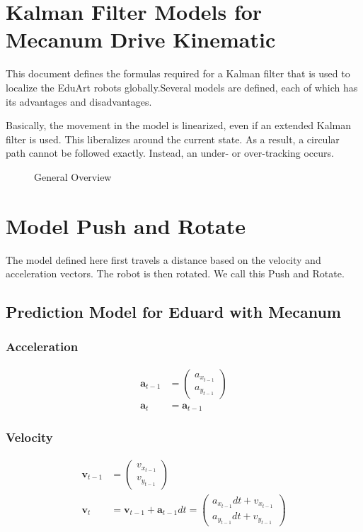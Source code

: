 \documentclass{article}
\begin{document}
\section{Kalman Filter Models for Mecanum Drive Kinematic}

This document defines the formulas required for a Kalman filter that is used to localize the EduArt robots globally.Several models are defined, each of which has its advantages and disadvantages. 

Basically, the movement in the model is linearized, even if an extended Kalman filter is used. This liberalizes around the current state. As a result, a circular path cannot be followed exactly. Instead, an under- or over-tracking occurs.

\begin{figure}
  \center
  
  \caption{General Overview}
  \label{fig:general_overview}
\end{figure}

\section{Model Push and Rotate}



The model defined here first travels a distance based on the velocity and acceleration vectors. The robot is then rotated. We call this Push and Rotate.

\subsection{Prediction Model for Eduard with Mecanum}

\subsubsection{Acceleration}
\begin{align}
  \textbf{a}_{t-1} &= \left(\begin{matrix}a_{x_{t-1}}\\a_{y_{t-1}}\end{matrix}\right) \\
  \textbf{a}_t &= \textbf{a}_{t-1}
\end{align}

\subsubsection{Velocity}
\begin{align}
  \textbf{v}_{t-1} &= \left(\begin{matrix}v_{x_{t-1}}\\v_{y_{t-1}}\end{matrix}\right) \\
  \textbf{v}_t &= \textbf{v}_{t-1} + \textbf{a}_{t-1} dt = 
  \left(\begin{matrix}a_{x_{t-1}} dt + v_{x_{t-1}}\\a_{y_{t-1}} dt + v_{y_{t-1}}\end{matrix}\right)
\end{align}
\end{document}
